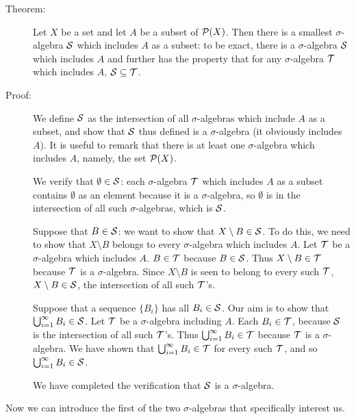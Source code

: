 \documentclass[12pt]{article}
\begin{document}
\begin{description}

\item[Theorem:]  Let $X$ be a set and let $A$ be a subset of ${\cal P}(X)$.  Then there is a smallest $\sigma$-algebra $\cal S$ which includes $A$ as a subset:  to be exact, there is a $\sigma$-algebra $\cal S$ which includes $A$ and further has the property that for any $\sigma$-algebra $\cal T$ which includes $A$, $\cal S \subseteq \cal T$.

\item[Proof:]  We define $\cal S$ as the intersection of all $\sigma$-algebras which include $A$ as a subset, and show that $\cal S$ thus defined is a $\sigma$-algebra (it obviously includes $A$).
It is useful to remark that there is at least one $\sigma$-algebra which includes $A$, namely, the set ${\cal P}(X)$.

We verify that $\emptyset \in \cal S$:  each $\sigma$-algebra $\cal T$ which includes $A$ as a subset contains $\emptyset$ as an element because it is a $\sigma$-algebra, so $\emptyset$ is in the intersection of all such $\sigma$-algebras, which is $\cal S$.

Suppose that $B \in \cal S$:  we want to show that $X \setminus B \in \cal S$.  To do this, we need to show that $X \setminus B$ belongs to every $\sigma$-algebra which includes $A$.
Let $\cal T$ be a $\sigma$-algebra which includes $A$.  $B \in \cal T$ because $B \in \cal S$.  Thus $X \setminus B \in \cal T$ because $\cal T$ is a $\sigma$-algebra.  Since $X \setminus B$ is seen to belong to every such $\cal T$, $X \setminus B \in \cal S$, the intersection of all such $\cal T$'s.

Suppose that a sequence $\{B_i\}$ has all $B_i \in \cal S$.  Our aim is to show that $\bigcup_{i=1}^\infty B_i \in \cal S$.  Let $\cal T$ be a $\sigma$-algebra including $A$.
Each $B_i \in \cal T$, because $\cal S$ is the intersection of all such $\cal T$'s.  Thus $\bigcup_{i=1}^\infty B_i \in \cal T$ because $\cal T$ is a $\sigma$-algebra.  We have shown that 
$\bigcup_{i=1}^\infty B_i \in \cal T$ for every such $\cal T$, and so $\bigcup_{i=1}^\infty B_i \in \cal S$.

We have completed the verification that $\cal S$ is a $\sigma$-algebra.



\end{description}

Now we can introduce the first of the two $\sigma$-algebras that specifically interest us.
\end{document}
